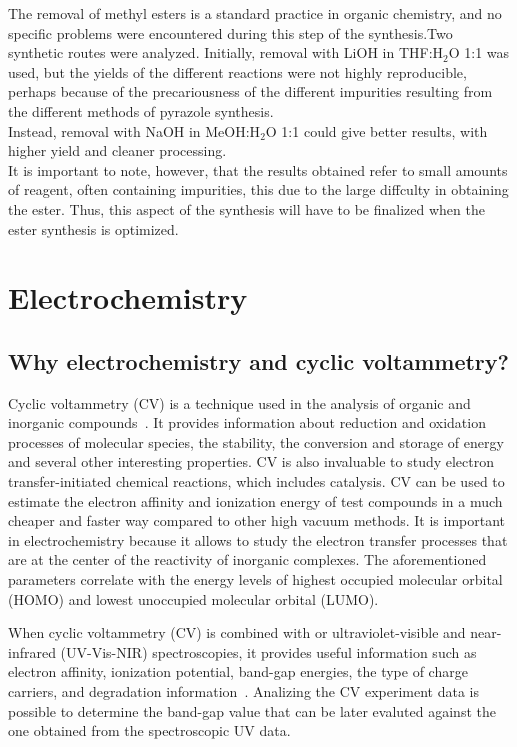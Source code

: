 \documentclass[../Master.tex]{subfiles}
\begin{document}
The removal of methyl esters is a standard practice in organic chemistry, and no specific problems were encountered during this step of the synthesis.Two synthetic routes were analyzed.
Initially, removal with LiOH in THF:H$_2$O 1:1 was used, but the yields of the different reactions were not highly reproducible, perhaps because of the precariousness of the different impurities resulting from the different methods of pyrazole synthesis. \\
Instead, removal with NaOH in MeOH:H$_{2}$O 1:1 could give better results, with higher yield and cleaner processing. \\
It is important to note, however, that the results obtained refer to small amounts of reagent, often containing impurities, this due to the large diffculty in obtaining the ester. Thus, this aspect of the synthesis will have to be finalized when the ester synthesis is optimized.

\newpage\section{Electrochemistry}\label{sec:electrochemistry}

\subsection{Why electrochemistry and cyclic voltammetry?}\label{sec:elect-intro}

Cyclic voltammetry (CV) is a technique used in the analysis of organic and inorganic compounds\ \cite{elgrishi_practical_2018}. It provides information about reduction and oxidation processes of molecular species, the stability, the conversion and storage of energy and several other interesting properties. CV is also invaluable to study electron transfer-initiated chemical reactions, which includes catalysis. CV can be used to estimate the electron affinity and ionization energy of test compounds in a much cheaper and faster way compared to other high vacuum methods. It is important in electrochemistry because it allows to study the electron transfer processes that are at the center of the reactivity of inorganic complexes.
The aforementioned parameters correlate with the energy levels of highest occupied molecular orbital (HOMO) and lowest unoccupied molecular orbital (LUMO).

When cyclic voltammetry (CV) is combined with or ultraviolet-visible and near-infrared (UV-Vis-NIR) spectroscopies, it provides useful information such as electron affinity, ionization potential, band-gap energies, the type of charge carriers, and degradation information\ \cite{pluczyk_using_2018}. Analizing the CV experiment data is possible to determine the band-gap value that can be later evaluted against the one obtained from the spectroscopic UV data.
\end{document}
